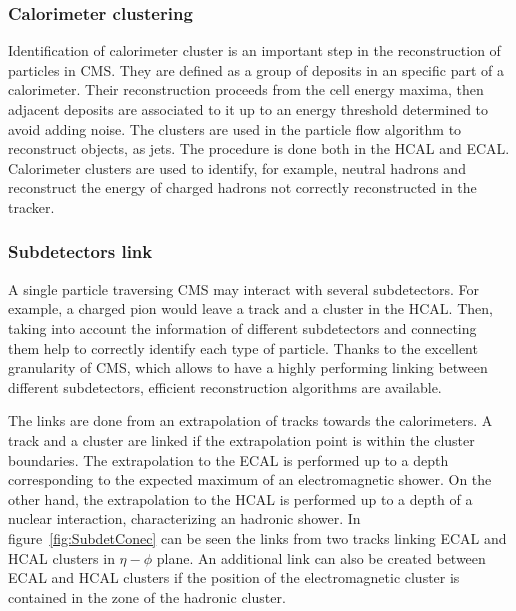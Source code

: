 \subsubsection{Calorimeter clustering}

Identification of calorimeter cluster is an important step in the reconstruction of particles in CMS. They are defined as a group of deposits in an specific part of a calorimeter. Their reconstruction proceeds from the cell energy maxima, then adjacent deposits are associated to it up to an energy threshold determined to avoid adding noise. The clusters are used in the particle flow algorithm to reconstruct objects, as jets. The procedure is done both in the HCAL and ECAL. Calorimeter clusters are used to identify, for example, neutral hadrons and reconstruct the energy of charged hadrons not correctly reconstructed in the tracker.    

\subsubsection{Subdetectors link}

A single particle traversing CMS may interact with several subdetectors. For example, a charged pion would leave a track and a cluster in the HCAL. Then, taking into account the information of different subdetectors and connecting them help to correctly identify each type of particle. Thanks to the excellent granularity of CMS, which allows to have a highly performing linking between different subdetectors, efficient reconstruction algorithms are available. 

The links are done from an extrapolation of tracks towards the calorimeters. A track and a cluster are linked if the extrapolation point is within the cluster boundaries. The extrapolation to the ECAL is performed up to a depth corresponding to the expected maximum of an electromagnetic shower. On the other hand, the extrapolation to the HCAL is performed up to a  depth of a nuclear interaction, characterizing an hadronic shower. In figure~\ref{fig:SubdetConec} can be seen the links from two tracks linking ECAL and HCAL clusters in $\eta-\phi$ plane. An additional link can also be created between ECAL and HCAL clusters if the position of the electromagnetic cluster is contained in the zone of the hadronic cluster.

